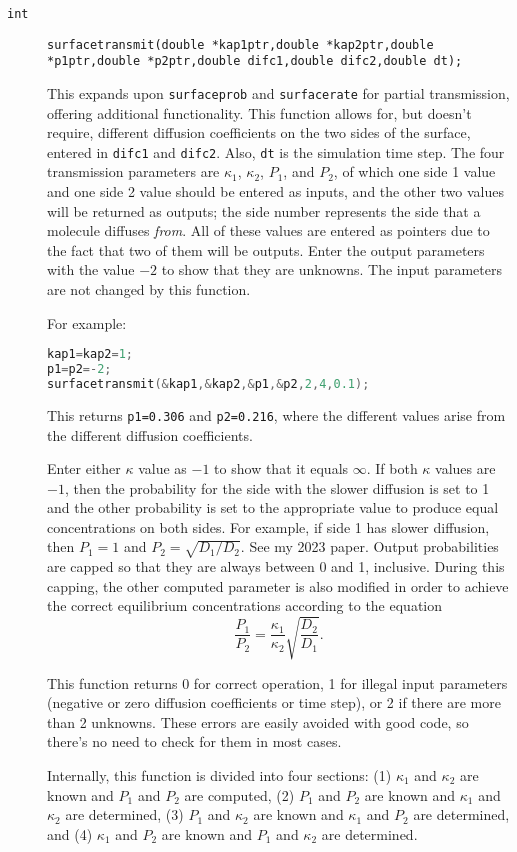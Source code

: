 \documentclass[11pt]{article}
\newcommand {\ttt} {\texttt}
\begin{document}
\begin{description}
\item[\ttt{int}]
\ttt{surfacetransmit(double *kap1ptr,double *kap2ptr,double *p1ptr,double *p2ptr,double difc1,double difc2,double dt);}

This expands upon \ttt{surfaceprob} and \ttt{surfacerate} for partial transmission, offering additional functionality. This function allows for, but doesn't require, different diffusion coefficients on the two sides of the surface, entered in \ttt{difc1} and \ttt{difc2}. Also, \ttt{dt} is the simulation time step. The four transmission parameters are $\kappa_1$, $\kappa_2$, $P_1$, and $P_2$, of which one side 1 value and one side 2 value should be entered as inputs, and the other two values will be returned as outputs; the side number represents the side that a molecule diffuses \textit{from}. All of these values are entered as pointers due to the fact that two of them will be outputs. Enter the output parameters with the value $-2$ to show that they are unknowns. The input parameters are not changed by this function.

For example:
\begin{lstlisting}[language=C]
kap1=kap2=1;
p1=p2=-2;
surfacetransmit(&kap1,&kap2,&p1,&p2,2,4,0.1);
\end{lstlisting}
This returns \ttt{p1=0.306} and \ttt{p2=0.216}, where the different values arise from the different diffusion coefficients.

Enter either $\kappa$ value as $-1$ to show that it equals $\infty$. If both $\kappa$ values are $-1$, then the probability for the side with the slower diffusion is set to 1 and the other probability is set to the appropriate value to produce equal concentrations on both sides. For example, if side 1 has slower diffusion, then $P_1=1$ and $P_2 = \sqrt{D_1 / D_2}$. See my 2023 paper. Output probabilities are capped so that they are always between 0 and 1, inclusive. During this capping, the other computed parameter is also modified in order to achieve the correct equilibrium concentrations according to the equation
$$\frac{P_1}{P_2} = \frac{\kappa_1}{\kappa_2}\sqrt{\frac{D_2}{D_1}}.$$

This function returns 0 for correct operation, 1 for illegal input parameters (negative or zero diffusion coefficients or time step), or 2 if there are more than 2 unknowns. These errors are easily avoided with good code, so there's no need to check for them in most cases.

Internally, this function is divided into four sections: (1) $\kappa_1$ and $\kappa_2$ are known and $P_1$ and $P_2$ are computed, (2) $P_1$ and $P_2$ are known and $\kappa_1$ and $\kappa_2$ are determined, (3) $P_1$ and $\kappa_2$ are known and $\kappa_1$ and $P_2$ are determined, and (4) $\kappa_1$ and $P_2$ are known and $P_1$ and $\kappa_2$ are determined.


\end{description}
\end{document}
